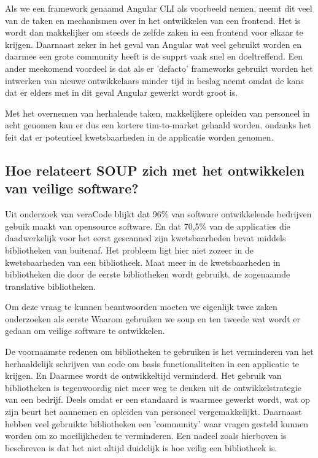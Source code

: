 Als we een framework genaamd Angular CLI als voorbeeld nemen, neemt dit veel van de taken en mechanismen over in het ontwikkelen van een frontend. Het is wordt dan makkelijker om steeds de zelfde zaken in een frontend voor elkaar te krijgen. Daarnaast zeker in het geval van Angular wat veel gebruikt worden en daarmee een grote community heeft is de supprt vaak snel en doeltreffend. Een ander meekomend voordeel is dat als er 'defacto' frameworks gebruikt worden het intwerken van nieuwe ontwikkelaars minder tijd in beslag neemt omdat de kans dat er elders met in dit geval Angular gewerkt wordt groot is.

Met het overnemen van herhalende taken, makkelijkere opleiden van personeel in acht genomen kan er dus een kortere tim-to-market gehaald worden. ondanks het feit dat er potentieel kwetsbaarheden in de applicatie worden genomen.

\subsection{Hoe relateert SOUP zich met het ontwikkelen van veilige software?}\label{subsec:hoe-relateert-soup-zich-met-het-ontwikkelen-van-veilige-software?}

Uit onderzoek van veraCode blijkt dat 96\% van software ontwikkelende bedrijven gebuik maakt van opensource software. En dat 70,5\% van de applicaties die daadwerkelijk voor het eerst gescanned zijn kwetsbaarheden bevat middels bibliotheken van buitenaf. Het probleem ligt hier niet zozeer in de kwetsbaarheden van een bibliotheek. Maat meer in de kwetsbaarheden in bibliotheken die door de eerste bibliotheken wordt gebruikt. de zogenaamde translative bibliotheken.


Om deze vraag te kunnen beantwoorden moeten we eigenlijk twee zaken onderzoeken als eerste  Waarom gebruiken we soup en ten tweede wat wordt er gedaan om veilige software te ontwikkelen.

De voornaamste redenen om bibliotheken te gebruiken is het verminderen van het herhaaldelijk schrijven van code om basis functionaliteiten in een applicatie te krijgen. En Daarmee wordt de ontwikkeltijd verminderd. Het gebruik van bibliotheken is tegenwoordig niet meer weg te denken uit de ontwikkelstrategie van een bedrijf. Deels omdat er een standaard is waarmee gewerkt wordt, wat op zijn beurt het aannemen en opleiden van personeel vergemakkelijkt. Daarnaast hebben veel gebruikte bibliotheken een 'community' waar vragen gesteld kunnen worden om zo moeilijkheden te verminderen. Een nadeel zoals hierboven is beschreven is dat het niet altijd duidelijk is hoe veilig een bibliotheek is.



